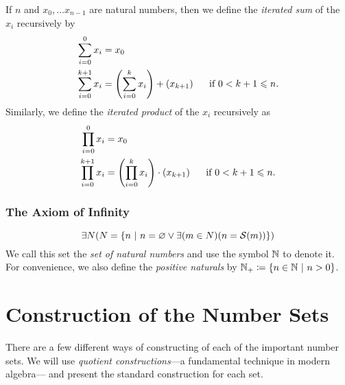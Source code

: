 \begin{definition}
    If \(n\) and \(x_0, \dots x_{n - 1}\) are natural numbers,
    then we define the \emph{iterated sum} of the \(x_i\) recursively by
    \begin{align*}
        \sum_{i = 0}^{0}x_i &= x_0\\
        \sum_{i = 0}^{k + 1}x_i &= \pn*{\sum_{i = 0}^{k}x_i} + \pn*{x_{k + 1}}~~~~\text{ if } 0 < k + 1 \leq n.
    \end{align*}
    Similarly, we define the \emph{iterated product} of the \(x_i\) recursively as
    \begin{align*}
        \prod_{i = 0}^{0}x_i &= x_0\\
        \prod_{i = 0}^{k + 1}x_i &= \pn*{\prod_{i = 0}^{k}x_i} \cdot \pn*{x_{k + 1}}~~~~\text{ if } 0 < k + 1 \leq n.
    \end{align*}
\end{definition}

\subsection{The Axiom of Infinity}
\begin{axiom}[Infinity]
    \[
        \exists N \pn*{N = \set*{n \suchthat n = \emptyset \join \exists\pn*{m \in N}\pn*{n = \successor{m}}}}
    \]
    We call this set the \emph{set of natural numbers} and use the symbol \(\mathbb{N}\) to denote it.
    For convenience,
    we also define the \emph{positive naturals} by \(\N_+ \defn \set*{n \in \N \suchthat n > 0}\).
\end{axiom}

\appendix
\chapter{Construction of the Number Sets}
There are a few different ways of constructing of each of the important number sets.
We will use \emph{quotient constructions}---a fundamental technique in modern algebra---%
and present the standard construction for each set.

